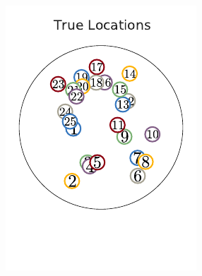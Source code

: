 \begin{figure}[t!]
  \centering
  \vspace{-.2in}
  \begin{subfigure}[b]{1.75in}
    \centering
    \caption{}
    \vspace{-.2in}
    \includegraphics[width=\textwidth]{figures/ch3/hipp_true_locations.pdf}
    \label{fig:hipp_true_locs}
  \end{subfigure}
  ~
  \begin{subfigure}[b]{1.75in}
    \centering
    \caption{}
    \vspace{-.2in}

\end{subfigure}
\end{figure}
